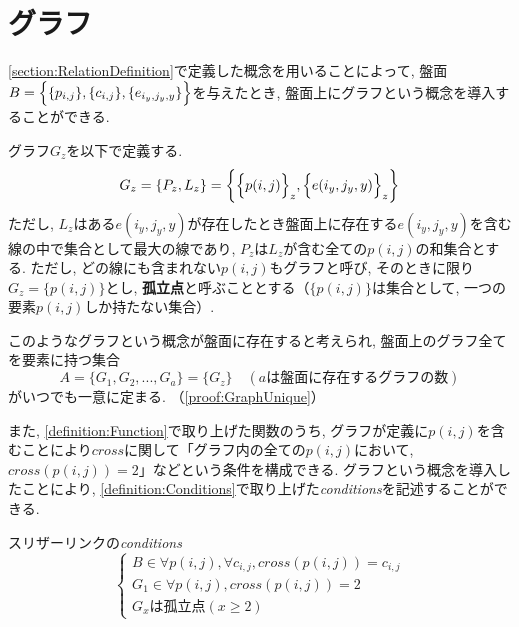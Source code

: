 \section{グラフ}\label{section:GraphDefinition}
\cref{section:RelationDefinition}で定義した概念を用いることによって, 盤面$B=\Bigl\{\{p_{i,j}\},\{c_{i,j}\},\{e_{i_y,j_y,y}\}\Bigr\}$を与えたとき, 盤面上にグラフという概念を導入することができる.

\begin{definition}[グラフ]\label{definition:GraphDefinition}
  グラフ$G_z$を以下で定義する.
  \begin{equation}
    G_z=\{P_z,L_z\}=\biggl\{  \Bigl\{p(i,j)\Bigr\}_z,\Bigl\{e(i_y,j_y,y)\Bigr\}_z\biggr\}
  \end{equation}
  ただし, $L_z$はある$e(i_y,j_y,y)$が存在したとき盤面上に存在する$e(i_y,j_y,y)$を含む線の中で集合として最大の線であり, $P_z$は$L_z$が含む全ての$p(i,j)$の和集合とする. ただし, どの線にも含まれない$p(i,j)$もグラフと呼び, そのときに限り$G_z=\{p(i,j)\}$とし, \textbf{孤立点}と呼ぶこととする（$\{p(i,j)\}$は集合として, 一つの要素$p(i,j)$しか持たない集合）.
\end{definition}

このようなグラフという概念が盤面に存在すると考えられ, 盤面上のグラフ全てを要素に持つ集合
\begin{equation}
  A=\{G_1,G_2,...,G_a\}=\{G_z\}\quad (aは盤面に存在するグラフの数)\label{equation:A}
\end{equation}
がいつでも一意に定まる. （\cref{proof:GraphUnique}）

また, \cref{definition:Function}で取り上げた関数のうち, グラフが定義に$p(i,j)$を含むことにより$\textit{cross}$に関して「グラフ内の全ての$p(i,j)$において, $\textit{cross}(p(i,j))=2$」などという条件を構成できる. グラフという概念を導入したことにより, \cref{definition:Conditions}で取り上げた\textit{conditions}を記述することができる.
\begin{example}\textup{スリザーリンクの\textit{conditions}}\label{example:SlitherLinkConditions}
  \begin{equation}
    \begin{cases}
      {B\in \forall p(i,j)   , \forall c_{i,j} , \textit{cross}(p(i,j))=c_{i,j} } \\
      {G_1\in \forall p(i,j)            , \textit{cross}(p(i,j))=2       }        \\
      {G_xは孤立点(x\ge 2)}
    \end{cases}
  \end{equation}
\end{example}
